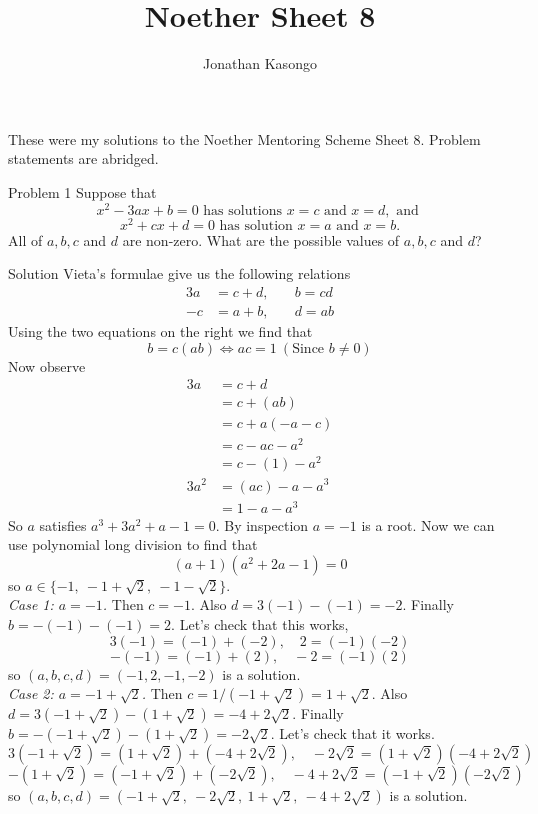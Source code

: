 \documentclass{article}
\author{Jonathan Kasongo}
\title{Noether Sheet 8}
\begin{document}
\maketitle
\centerline{
These were my solutions to the Noether Mentoring Scheme Sheet 8. Problem
statements are abridged.
}

\begin{problem}{Problem 1}
Suppose that
$$
x^2 - 3ax + b = 0 \text{ has solutions } x=c \text{ and } x=d, \text{ and }
$$
$$
x^2 + cx + d = 0 \text{ has solution } x=a \text{ and } x=b.
$$
All of $a,b,c$ and $d$ are non-zero. What are the possible values of
$a,b,c$ and $d$?
\end{problem}

\begin{solution}{Solution}
Vieta's formulae give us the following relations
\[
\begin{aligned}
3a &= c + d, \quad &b = cd \\
-c &= a + b, \quad &d = ab
\end{aligned}
\]
Using the two equations on the right we find that
$$
b = c(ab) \iff ac = 1 \ (\text{Since } b\neq0)
$$
Now observe
\[
\begin{aligned}
3a &= c + d\\
&= c + (ab)\\
&= c + a(-a-c)\\
&= c - ac - a^2\\
&= c - (1) - a^2 \\
3a^2 &= (ac) - a - a^3\\
&= 1 - a - a^3
\end{aligned}
\]
So $a$ satisfies $a^3 + 3a^2 + a - 1 = 0$. By inspection $a = -1$ is a
root. Now we can use polynomial long division to find that
$$
(a+1)(a^2 + 2a - 1) = 0
$$
so $a \in \{-1, \ -1+\sqrt2, \ -1-\sqrt2 \}$.
\\

\textit{Case 1: $a=-1$.} Then $c = -1$. Also $d = 3(-1) - (-1) = -2$.
Finally $b = -(-1) - (-1) = 2$. Let's check that this works,
$$
3(-1) = (-1) + (-2), \quad 2 = (-1)(-2)
$$
$$
-(-1) = (-1) + (2), \quad -2 = (-1)(2)
$$
so $(a,b,c,d)=(-1,2,-1,-2)$ is a solution. \\

\textit{Case 2: $a = -1 + \sqrt2$.} Then $c = 1/(-1 + \sqrt2) = 1+\sqrt2$.
Also $d = 3(-1 + \sqrt2) - (1 + \sqrt2) = -4 + 2\sqrt2$. Finally
$b = -(-1 + \sqrt2) - (1 + \sqrt2) = - 2\sqrt2$. Let's check that it
works.
$$
3(-1 + \sqrt2) = (1 + \sqrt2) + (-4 + 2\sqrt2), \quad
-2\sqrt2 = (1+\sqrt2)(-4+2\sqrt2)
$$
$$
-(1 + \sqrt2) = (-1+\sqrt2) + (-2\sqrt2), \quad
-4 + 2\sqrt2 = (-1+\sqrt2)(-2\sqrt2)
$$
so $(a,b,c,d) = (-1+\sqrt2, \ -2\sqrt2, \ 1+\sqrt2, \ -4+2\sqrt2)$
is a solution.
\\


\end{solution}
\end{document}

